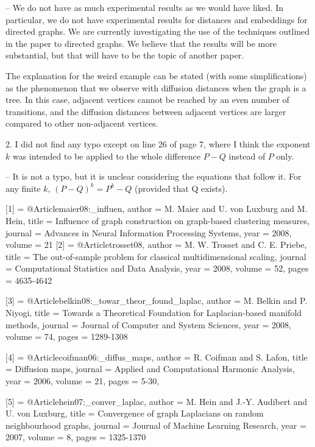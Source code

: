 -- We do not have as much experimental results as we would have
liked. In particular, we do not have experimental results for
distances and embeddings for directed graphs. We are currently
investigating the use of the techniques outlined in the paper to
directed graphs. We believe that the results will be more substantial,
but that will have to be the topic of another paper. 

The explanation for the weird example can be stated (with some
simplifications) as the phenomenon that we observe with diffusion
distances when the graph is a tree. In this case, adjacent vertices
cannot be reached by an even number of transitions, and the diffusion
distances between adjacent vertices are larger compared to other
non-adjacent vertices.

2. I did not find any typo except
on line 26 of page 7, where I think the exponent $k$ was intended to
be applied to the whole difference $P-Q$ instead of $P$ only.

-- It is not a typo, but it is unclear considering the equations
that follow it. For any finite $k$, $(P-Q)^{k} = P^{k} - Q$ (provided that Q
exists).



[1] = @Article{maier08:_influen,
  author =		 {M. Maier and U. von {L}uxburg and M. Hein},
  title =		 {Influence of graph construction on graph-based
                  clustering measures},
  journal =		 {Advances in Neural Information Processing Systems},
  year =		 2008,
  volume =		 21
}
[2] = @Article{trosset08,
  author =		 {M. W. Trosset and C. E. Priebe},
  title =		 {The out-of-sample problem for classical
                  multidimensional scaling},
  journal =		 {Computational Statistics and Data Analysis},
  year =		 2008,
  volume =		 52,
  pages =		 {4635-4642}
}

[3] = @Article{belkin08:_towar_theor_found_laplac,
  author =		 {M. Belkin and P. Niyogi},
  title =		 {Towards a Theoretical Foundation for
                  {L}aplacian-based manifold methods},
  journal =		 {Journal of Computer and System Sciences},
  year =		 2008,
  volume =		 74,
  pages =		 {1289-1308}
}

[4] = @Article{coifman06:_diffus_maps,
  author =		 {R. Coifman and S. Lafon},
  title =		 {Diffusion maps},
  journal =		 {Applied and Computational Harmonic Analysis},
  year =		 2006,
  volume =		 21,
  pages =		 {5-30},
}

[5] = @Article{hein07:_conver_laplac,
  author =		 {M. Hein and J.-Y. Audibert and U. von Luxburg},
  title =		 {Convergence of graph Laplacians on random
                  neighbourhood graphs},
  journal =		 {Journal of Machine Learning Research},
  year =		 2007,
  volume =		 8,
  pages =		 {1325-1370}
}

